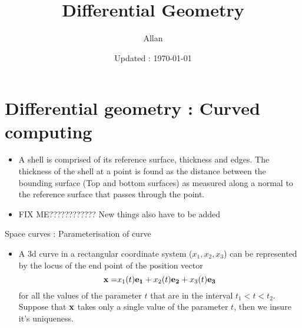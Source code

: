 


\title{Differential Geometry  }
\author{Allan}
\date{Updated : \today}



\maketitle
\tableofcontents	

\section{Differential geometry : Curved computing}


	\begin{frame}
		\begin{itemize}
			\item A shell is comprised of its reference surface, thickness and edges. The thickness of the shell at a point is found as the distance between the bounding surface (Top and bottom surfaces) as measured along a normal to the reference surface that passes through the point.  
			\item FIX ME???????????? New things also have to be added
		\end{itemize}
	\end{frame}


	\begin{frame}{Space curves : Parameterisation of curve}
		\begin{itemize}
			\item A 3d curve in a rectangular coordinate system ($x_1,x_2,x_3$) can be represented by the locus of the end point of the position vector
			\begin{equation}
				\mathbf{x =} x_1(t)\mathbf{e_1} + x_2(t)\mathbf{e_2} + x_3(t)\mathbf{e_3} 
			\end{equation}
			for all the values of the parameter $t$ that are in the interval $t_1<t<t_2$. Suppose that $\mathbf{x}$ takes only  a single value of the parameter $t$, then we insure it's uniqueness. 
		\end{itemize}
	\end{frame}



